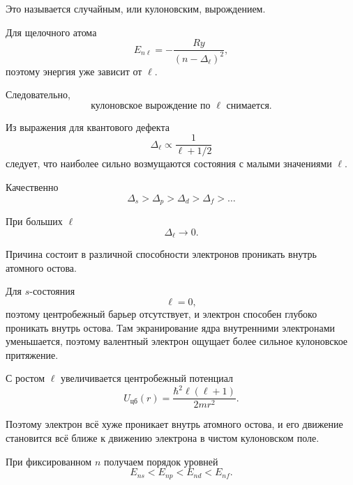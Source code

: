 \documentclass[../final.tex]{subfiles}
\begin{document}
Это называется случайным, или кулоновским, вырождением.

Для щелочного атома
\begin{equation*}
    E_{n\ell}
    =
    -\frac{Ry}{(n-\Delta_\ell)^2},
\end{equation*}
поэтому энергия уже зависит от \(\ell\).

Следовательно,
\begin{equation*}
    \boxed{
        \text{кулоновское вырождение по }\ell
        \text{ снимается}.
    }
\end{equation*}

Из выражения для квантового дефекта
\begin{equation*}
    \Delta_\ell
    \propto
    \frac{1}{\ell+1/2}
\end{equation*}
следует, что наиболее сильно возмущаются состояния с малыми
значениями \(\ell\).

Качественно
\begin{equation*}
    \Delta_s
    >
    \Delta_p
    >
    \Delta_d
    >
    \Delta_f
    >\ldots
\end{equation*}

При больших \(\ell\)
\begin{equation*}
    \Delta_\ell\rightarrow0.
\end{equation*}

Причина состоит в различной способности электронов проникать внутрь
атомного остова.

Для \(s\)-состояния
\begin{equation*}
    \ell=0,
\end{equation*}
поэтому центробежный барьер отсутствует, и электрон способен глубоко
проникать внутрь остова. Там экранирование ядра внутренними электронами
уменьшается, поэтому валентный электрон ощущает более сильное
кулоновское притяжение.

С ростом \(\ell\) увеличивается центробежный потенциал
\begin{equation*}
    U_{\text{цб}}(r)
    =
    \frac{\hbar^2\ell(\ell+1)}{2mr^2}.
\end{equation*}

Поэтому электрон всё хуже проникает внутрь атомного остова,
и его движение становится всё ближе к движению электрона в чистом
кулоновском поле.

При фиксированном \(n\) получаем порядок уровней
\begin{equation*}
    \boxed{
        E_{ns}
        <
        E_{np}
        <
        E_{nd}
        <
        E_{nf}
    }.
\end{equation*}
\end{document}
